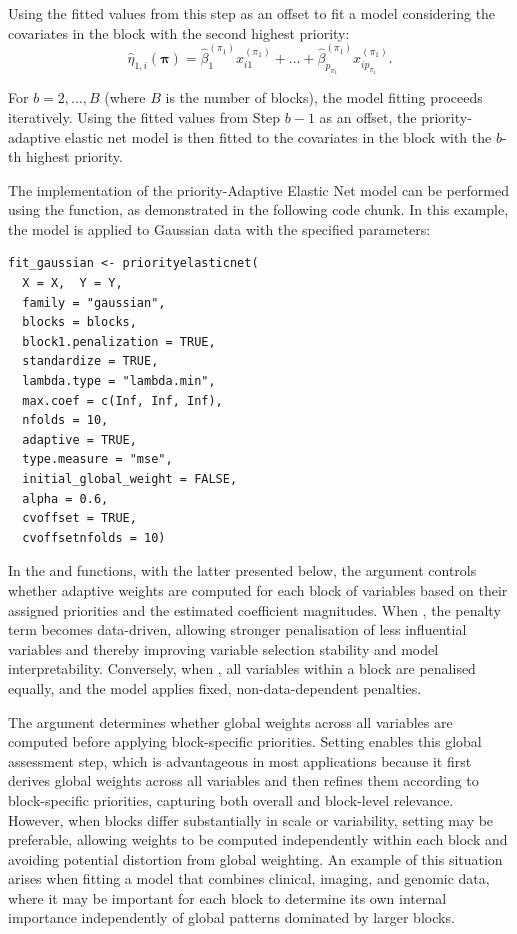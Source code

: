 Using the fitted values from this step as an offset to fit a model considering the covariates in the
block with the second highest priority:
\begin{equation}
\hat{\eta}_{1,i}(\bm{\pi})= \hat{\beta}_1^{(\pi_1)}x_{i1}^{(\pi_1)} + . . . + \hat{\beta}_{p_{\pi_1}}^{(\pi_1)} 
x_{ip_{\pi_1}}^{(\pi_1)}.
\end{equation}

For $b = 2, \dots, B$ (where $B$ is the number of blocks), the model fitting proceeds iteratively. Using the fitted values from Step $b-1$ as an offset, the priority-adaptive elastic net model is then fitted to the covariates in the block with the $b$-th highest priority. 

The implementation of the priority-Adaptive Elastic Net model can be performed using the  function, as demonstrated in the following code chunk. In this example, the model is applied to Gaussian data with the specified parameters:
{\small
\begin{lstlisting}
fit_gaussian <- priorityelasticnet(
  X = X,  Y = Y,
  family = "gaussian",
  blocks = blocks,
  block1.penalization = TRUE,
  standardize = TRUE,
  lambda.type = "lambda.min",
  max.coef = c(Inf, Inf, Inf),
  nfolds = 10,
  adaptive = TRUE,
  type.measure = "mse",
  initial_global_weight = FALSE,
  alpha = 0.6,
  cvoffset = TRUE,
  cvoffsetnfolds = 10)
\end{lstlisting}
}

In the  and  functions, with the latter presented below, the  argument controls whether adaptive weights are computed for each block of variables based on their assigned priorities and the estimated coefficient magnitudes. When , the penalty term becomes data-driven, allowing stronger penalisation of less influential variables and thereby improving variable selection stability and model interpretability. Conversely, when , all variables within a block are penalised equally, and the model applies fixed, non-data-dependent penalties.

The  argument determines whether global weights across all variables are computed before applying block-specific priorities. Setting 
 enables this global assessment step, which is advantageous in most applications because it first derives global weights across all variables and then refines them according to block-specific priorities, capturing both overall and block-level relevance. However, when blocks differ substantially in scale or variability, setting  may be preferable, allowing weights to be computed independently within each block and avoiding potential distortion from global weighting. An example of this situation arises when fitting a model that combines clinical, imaging, and genomic data, where it may be important for each block to determine its own internal importance independently of global patterns dominated by larger blocks.

